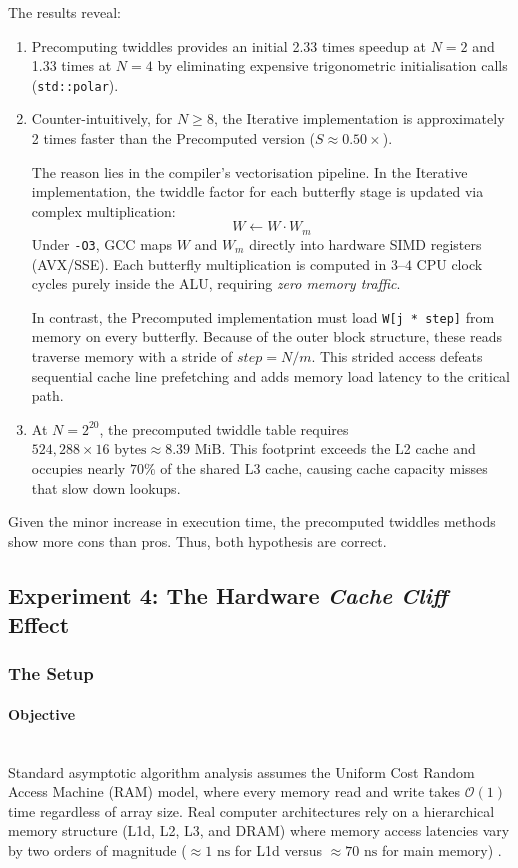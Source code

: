 \documentclass{article}
\begin{document}
The results reveal:
\begin{enumerate}
    \item Precomputing twiddles provides an initial 2.33 times speedup at $N = 2$ and 1.33 times at $N = 4$ by eliminating expensive trigonometric initialisation calls (\texttt{std::polar}).
    \item Counter-intuitively, for $N \ge 8$, the Iterative implementation is approximately 2 times faster than the Precomputed version ($S \approx 0.50\times$). 
    
    The reason lies in the compiler's vectorisation pipeline. In the Iterative implementation, the twiddle factor for each butterfly stage is updated via complex multiplication:
    \begin{equation}
    W \gets W \cdot W_m
    \end{equation}
    Under \texttt{-O3}, GCC maps $W$ and $W_m$ directly into hardware SIMD registers (AVX/SSE). Each butterfly multiplication is computed in $3$--$4$ CPU clock cycles purely inside the ALU, requiring \textit{zero memory traffic}.
    
    In contrast, the Precomputed implementation must load \texttt{W[j * step]} from memory on every butterfly. Because of the outer block structure, these reads traverse memory with a stride of $step = N / m$. This strided access defeats sequential cache line prefetching and adds memory load latency to the critical path.
    \item At $N = 2^{20}$, the precomputed twiddle table requires $524,288 \times 16\text{ bytes} \approx 8.39\text{ MiB}$. This footprint exceeds the L2 cache and occupies nearly $70\%$ of the shared L3 cache, causing cache capacity misses that slow down lookups.
\end{enumerate}
Given the minor increase in execution time, the precomputed twiddles methods show more cons than pros. Thus, both hypothesis are correct.

\subsection{Experiment 4: The Hardware \emph{Cache Cliff} Effect} \label{sec:exp4_design}
\subsubsection*{The Setup}
\paragraph{Objective}~{}\\
Standard asymptotic algorithm analysis assumes the Uniform Cost Random Access Machine (RAM) model, where every memory read and write takes $\mathcal{O}(1)$ time regardless of array size. Real computer architectures rely on a hierarchical memory structure (L1d, L2, L3, and DRAM) where memory access latencies vary by two orders of magnitude ($\approx 1\text{ ns}$ for L1d versus $\approx 70\text{ ns}$ for main memory) \cite{aggarwal1988}.
\end{document}
